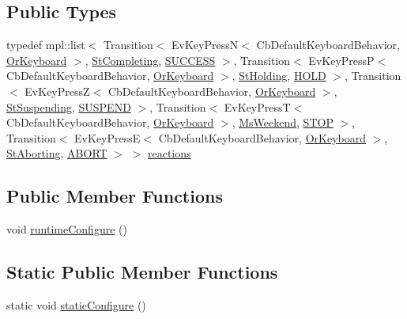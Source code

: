 \subsection*{Public Types}
\begin{DoxyCompactItemize}
\item 
typedef mpl\+::list$<$ Transition$<$ Ev\+Key\+PressN$<$ Cb\+Default\+Keyboard\+Behavior, \hyperlink{classsm__calendar__week_1_1OrKeyboard}{Or\+Keyboard} $>$, \hyperlink{structsm__calendar__week_1_1StCompleting}{St\+Completing}, \hyperlink{classSUCCESS}{S\+U\+C\+C\+E\+SS} $>$, Transition$<$ Ev\+Key\+PressP$<$ Cb\+Default\+Keyboard\+Behavior, \hyperlink{classsm__calendar__week_1_1OrKeyboard}{Or\+Keyboard} $>$, \hyperlink{structsm__calendar__week_1_1StHolding}{St\+Holding}, \hyperlink{structsm__calendar__week_1_1StExecute_1_1HOLD}{H\+O\+LD} $>$, Transition$<$ Ev\+Key\+PressZ$<$ Cb\+Default\+Keyboard\+Behavior, \hyperlink{classsm__calendar__week_1_1OrKeyboard}{Or\+Keyboard} $>$, \hyperlink{structsm__calendar__week_1_1StSuspending}{St\+Suspending}, \hyperlink{structsm__calendar__week_1_1StExecute_1_1SUSPEND}{S\+U\+S\+P\+E\+ND} $>$, Transition$<$ Ev\+Key\+PressT$<$ Cb\+Default\+Keyboard\+Behavior, \hyperlink{classsm__calendar__week_1_1OrKeyboard}{Or\+Keyboard} $>$, \hyperlink{classsm__calendar__week_1_1MsWeekend}{Ms\+Weekend}, \hyperlink{structsm__calendar__week_1_1StExecute_1_1STOP}{S\+T\+OP} $>$, Transition$<$ Ev\+Key\+PressE$<$ Cb\+Default\+Keyboard\+Behavior, \hyperlink{classsm__calendar__week_1_1OrKeyboard}{Or\+Keyboard} $>$, \hyperlink{structsm__calendar__week_1_1StAborting}{St\+Aborting}, \hyperlink{classABORT}{A\+B\+O\+RT} $>$ $>$ \hyperlink{structsm__calendar__week_1_1StExecute_aca331139b4bd3db4960af162cddcecaa}{reactions}
\end{DoxyCompactItemize}
\subsection*{Public Member Functions}
\begin{DoxyCompactItemize}
\item 
void \hyperlink{structsm__calendar__week_1_1StExecute_ad8912a25fe990e16806f24888ff6c99b}{runtime\+Configure} ()
\end{DoxyCompactItemize}
\subsection*{Static Public Member Functions}
\begin{DoxyCompactItemize}
\item 
static void \hyperlink{structsm__calendar__week_1_1StExecute_a2a1eb3363efd8f93dd1dc3b0f6fab79b}{static\+Configure} ()
\end{DoxyCompactItemize}
